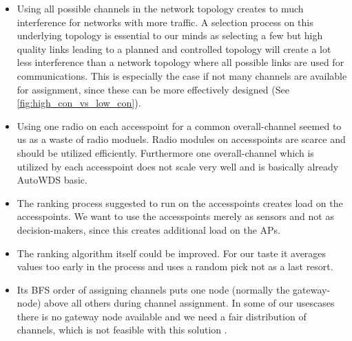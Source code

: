     \begin{itemize}
      \item Using all possible channels in the network topology creates to much interference for networks with more traffic.
	A selection process on this underlying topology is essential to our minds as selecting a few but high quality links
	leading to a planned and controlled topology will create a lot less interference than a network topology where all possible 
	links are used for communications. This is especially the case if not many channels are available for assignment, since 
	these can be more effectively designed (See \ref{fig:high_con_vs_low_con}).
	
      \item Using one radio on each accesspoint for a common overall-channel seemed to us as a waste of radio moduels.
	Radio modules on accesspoints are scarce and should be utilized efficiently. 
	Furthermore one overall-channel which is utilized by each accesspoint 
	does not scale very well and is basically already AutoWDS basic.
	
      \item The ranking process suggested to run on the accesspoints creates load on the accesspoints.
	We want to use the accesspoints merely as sensors and not as decision-makers, since this creates additional load on the APs.
	
      \item The ranking algorithm itself could be improved. 
	For our taste it averages values too early in the process and uses a random pick not as a last resort.
	
      \item Its \ac{BFS} order of assigning channels puts one node (normally the gateway-node) above all others during channel assignment.
	In some of our usescases there is no gateway node available and we need a fair distribution of channels, which is not feasible with this solution \cite{overview_caa}.
    \end{itemize}

